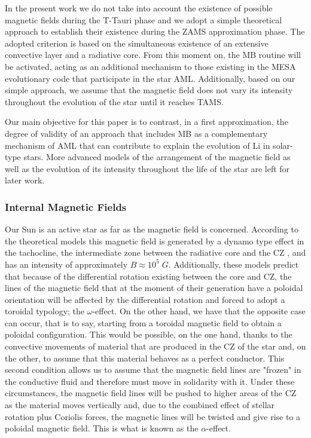 \documentclass[fleqn,usenatbib]{mnras}
\begin{document}
In the present work we do not take into account the existence of possible magnetic fields during the T-Tauri phase and we adopt a simple theoretical approach to establish their existence during the ZAMS approximation phase. The adopted criterion is based on the simultaneous existence of an extensive convective layer and a radiative core. From this moment on, the MB routine will be activated, acting as an additional mechanism to those existing in the MESA evolutionary code that participate in the star AML. Additionally, based on our simple approach, we assume that the magnetic field does not vary its intensity throughout the evolution of the star until it reaches TAMS.\par

Our main objective for this paper is to contrast, in a first approximation, the degree of validity of an approach that includes MB as a complementary mechanism of AML that can contribute to explain the evolution of Li in solar-type stars. More advanced models of the arrangement of the magnetic field as well as the evolution of its intensity throughout the life of the star are left for later work.\par

\subsubsection{Internal Magnetic Fields}
Our Sun is an active star as far as the magnetic field is concerned. According to the theoretical models this magnetic field is generated by a dynamo type effect in the tachocline, the intermediate zone between the radiative core and the CZ \citep{Aschwanden2014}, and has an intensity of approximately $B\approx10^5\; G$. Additionally, these models predict that because of the differential rotation existing between the core and CZ, the lines of the magnetic field that at the moment of their generation have a poloidal orientation will be affected by the differential rotation and forced to adopt a toroidal typology; the $\omega$-effect. On the other hand, we have that the opposite case can occur, that is to say, starting from a toroidal magnetic field to obtain a poloidal configuration. This would be possible, on the one hand, thanks to the convective movements of material that are produced in the CZ of the star and, on the other, to assume that this material behaves as a perfect conductor. This second condition allows us to assume that the magnetic field lines are "frozen" in the conductive fluid and therefore must move in solidarity with it. Under these circumstances, the magnetic field lines will be pushed to higher areas of the CZ as the material moves vertically and, due to the combined effect of stellar rotation plus Coriolis forces, the magnetic lines will be twisted and give rise to a poloidal magnetic field. This is what is known as the $\alpha$-effect.\par
\end{document}
